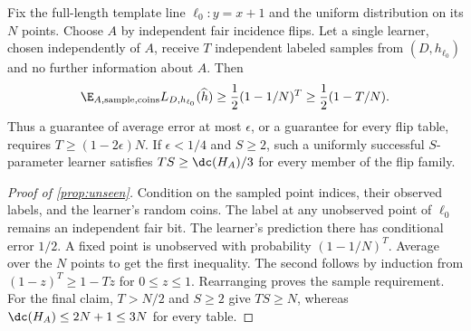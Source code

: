 \begin{proposition}\label{prop:unseen}
Fix the full-length template line $\ell_0:y=x+1$ and the uniform distribution on its $N$ points. Choose $A$ by independent fair incidence flips. Let a single learner, chosen independently of $A$, receive $T$ independent labeled samples from $(D,h_{\ell_0})$ and no further information about $A$. Then
\[
 \E_{A,\mathrm{sample},\mathrm{coins}}L_{D,h_{\ell_0}}(\widehat h)
 \ge\frac12(1-1/N)^T
 \ge\frac12(1-T/N).
\]
Thus a guarantee of average error at most $\epsilon$, or a guarantee for every flip table, requires $T\ge(1-2\epsilon)N$. If $\epsilon<1/4$ and $S\ge2$, such a uniformly successful $S$-parameter learner satisfies $TS\ge\dc(H_A)/3$ for every member of the flip family.
\end{proposition}

\begin{proof}[Proof of \cref{prop:unseen}]
Condition on the sampled point indices, their observed labels, and the learner's random coins. The label at any unobserved point of $\ell_0$ remains an independent fair bit. The learner's prediction there has conditional error $1/2$. A fixed point is unobserved with probability $(1-1/N)^T$. Average over the $N$ points to get the first inequality. The second follows by induction from $(1-z)^T\ge1-Tz$ for $0\le z\le1$. Rearranging proves the sample requirement. For the final claim, $T>N/2$ and $S\ge2$ give $TS\ge N$, whereas $\dc(H_A)\le2N+1\le3N$ for every table.
\end{proof}

